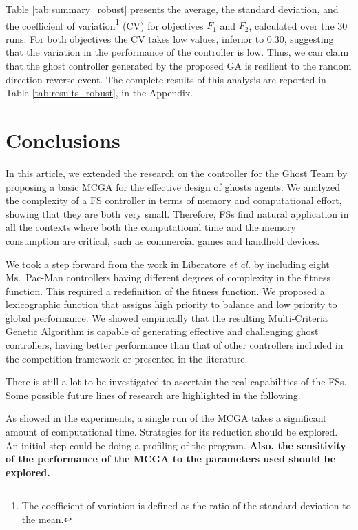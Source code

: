 \documentclass[journal]{IEEEtran}
\begin{document}
Table \ref{tab:summary_robust} presents the average, the standard deviation, and the coefficient of variation\footnote{The coefficient of variation is defined as the ratio of the standard deviation to the mean.} (CV) for objectives $F_1$ and $F_2$, calculated over the 30 runs. For both objectives the CV takes low values, inferior to 0.30, suggesting that the variation in the performance of the controller is low. Thus, we can claim that the ghost controller generated by the proposed GA is resilient to the random direction reverse event. The complete results of this analysis are reported in Table \ref{tab:results_robust}, in the Appendix.

\section{Conclusions}
\label{sec:Conclusions}
In this article, we extended the research on the controller for the Ghost Team by proposing a basic MCGA for the effective design of ghosts agents. We analyzed the complexity of a FS controller in terms of memory and computational effort, showing that they are both very small. Therefore, FSs find natural application in all the contexts where both the computational time and the memory consumption are critical, such as commercial games and handheld devices.

We took a step forward from the work in Liberatore \emph{et al.} \cite{Liberatore2014} by including eight Ms.\  Pac-Man controllers having different degrees of complexity in the fitness function. This required a redefinition of the fitness function. We proposed a lexicographic function that assigns high priority to balance and low priority to global performance. We showed empirically that the resulting Multi-Criteria Genetic Algorithm is capable of generating effective and challenging ghost controllers, having better performance than that of other controllers included in the competition framework or presented in the literature.

There is still a lot to be investigated to ascertain the real capabilities of the FSs. Some possible future lines of research are highlighted in the following.

As showed in the experiments, a single run of the MCGA takes a significant amount of computational time. Strategies for its reduction should be explored. An initial step could be doing a profiling of the program. \textbf{Also, the sensitivity of the performance of the MCGA to the parameters used should be explored.}
\end{document}
